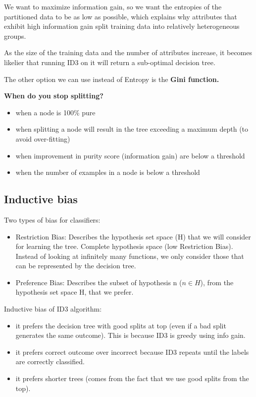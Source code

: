 \documentclass[12pt]{report}
\begin{document}
We want to maximize information gain, so we want the entropies of the partitioned data to be as low as possible, which explains why attributes that exhibit high information gain split training data into relatively heterogeneous groups.

As the size of the training data and the number of attributes increase, it becomes likelier that running ID3 on it will return a sub-optimal decision tree.


The other option we can use instead of Entropy is the \textbf{Gini function.}

\hfill \break
\textbf{When do you stop splitting?}
\begin{itemize}
	\item when a node is 100\% pure
	\item when splitting a node will result in the tree exceeding a maximum depth (to avoid over-fitting)
	\item when improvement in purity score (information gain) are below a threshold
	\item when the number of examples in a node is below a threshold
\end{itemize}

\subsection{Inductive bias}
Two types of bias for classifiers:
\begin{itemize}
	\item Restriction Bias: Describes the hypothesis set space (H) that we will consider for learning the tree.
	Complete hypothesis space (low Restriction Bias). Instead of looking at infinitely many functions, we only consider those that can be represented by the decision tree.
	\item Preference Bias: Describes the subset of hypothesis n ($n \in H $), from the hypothesis set space H, that we prefer.
\end{itemize}

Inductive bias of ID3 algorithm:
\begin{itemize}
\item it prefers the decision tree with good splits at top (even if a bad split generates the same outcome). This is because ID3 is greedy using info gain.
\item it prefers correct outcome over incorrect because ID3 repeats until the labels are correctly classified.
\item it prefers shorter trees (comes from the fact that we use good splits from the top).
\end{itemize}
\end{document}
